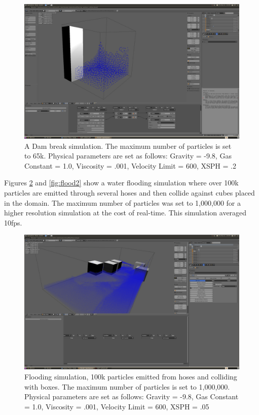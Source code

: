\begin{figure}[!htc]
		\includegraphics[scale=0.4]{figures/dam_break.png}
        \caption{ A Dam break simulation. The maximum number of particles is set to 65k.
        Physical parameters are set as follows: Gravity = -9.8, Gas
        Constant = 1.0, Viscosity = .001, Velocity Limit = 600, XSPH = .2}
		\label{fig:dam_break}
\end{figure}

\pagebreak
\clearpage

Figures \ref{fig:flood1} and \ref{fig:flood2} show a water flooding simulation where
over 100k particles are emitted through several hoses and then collide against
cubes placed in the domain. The maximum number of particles was set to
1,000,000 for a higher resolution simulation at the cost of real-time. This
simulation averaged 10fps.


\begin{figure}[!htc]
		\includegraphics[scale=0.4]{figures/flood1.png}
        \caption{ Flooding simulation, 100k particles emitted from hoses and
        colliding with boxes. The maximum number of particles is set to
        1,000,000. Physical parameters are set as follows: Gravity = -9.8, Gas
        Constant = 1.0, Viscosity = .001, Velocity Limit = 600, XSPH = .05}
		\label{fig:flood1}
\end{figure}

